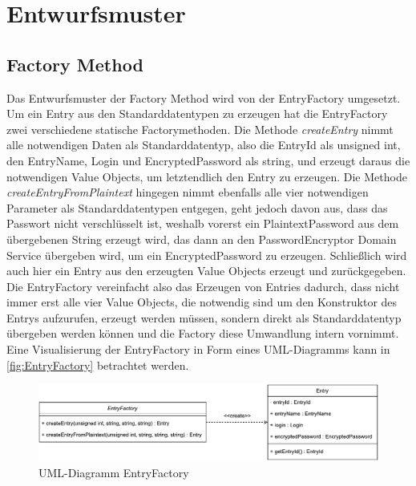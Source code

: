 \chapter{Entwurfsmuster}
\section{Factory Method}
Das Entwurfsmuster der Factory Method wird von der EntryFactory umgesetzt. Um ein Entry aus den Standarddatentypen zu erzeugen hat die EntryFactory zwei verschiedene statische Factorymethoden. Die Methode \textit{createEntry} nimmt alle notwendigen Daten als Standarddatentyp, also die EntryId als unsigned int, den EntryName, Login und EncryptedPassword als string, und erzeugt daraus die notwendigen Value Objects, um letztendlich den Entry zu erzeugen. Die Methode \textit{createEntryFromPlaintext} hingegen nimmt ebenfalls alle vier notwendigen Parameter als Standarddatentypen entgegen, geht jedoch davon aus, dass das Passwort nicht verschlüsselt ist, weshalb vorerst ein PlaintextPassword aus dem übergebenen String erzeugt wird, das dann an den PasswordEncryptor Domain Service übergeben wird, um ein EncryptedPassword zu erzeugen. Schließlich wird auch hier ein Entry aus den erzeugten Value Objects erzeugt und zurückgegeben. Die EntryFactory vereinfacht also das Erzeugen von Entries dadurch, dass nicht immer erst alle vier Value Objects, die notwendig sind um den Konstruktor des Entrys aufzurufen, erzeugt werden müssen, sondern direkt als Standarddatentyp übergeben werden können und die Factory diese Umwandlung intern vornimmt. Eine Visualisierung der EntryFactory in Form eines UML-Diagramms kann in \autoref{fig:EntryFactory} betrachtet werden.\\

\begin{figure}[ht]
	\centering
	\includegraphics[width=1.0\textwidth]{Bilder/EntryFactory.pdf}
	\caption{UML-Diagramm EntryFactory}
	\label{fig:EntryFactory}
\end{figure}
